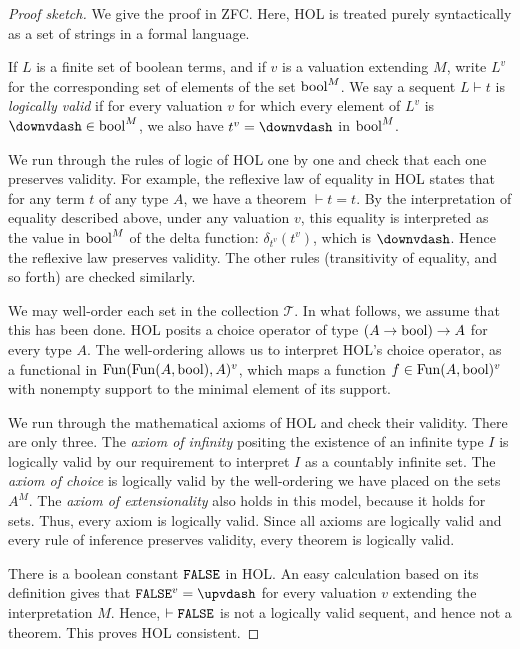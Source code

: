 \documentclass[brochure,english,12pt]{bourbaki}
\theoremstyle{plain}
\def\op#1{{\operatorname{#1}}}
\def\T{{\mathcal T}}
\begin{document}
\begin{proof}[Proof sketch]
We give the proof in ZFC.  Here, HOL is treated purely syntactically as a set of strings in 
a formal language.

If $L$ is a finite set of boolean terms, and if $v$ is a valuation extending $M$,  
write $L^{v}$ for the corresponding set of elements of the set $\bool^M$.
We say a sequent $L \vdash t$ is {\it logically valid}
if for every valuation $v$ for which every element of $L^{v}$ is $\downvdash \in \bool^M$, we also have
$t^{v}=\downvdash $ in $\bool^M$.

We run through the rules of logic of HOL one by one and check that each one preserves
validity.  For example, the reflexive law of equality in HOL states that for any term $t$
of any type $A$, we have a theorem $\vdash t = t$.  By the interpretation of equality described above, under
any valuation $v$, this equality is interpreted as the value in $\bool^M$ of the delta function: 
$\delta_{t^{v}}(t^{v})$, which is $\downvdash $.  Hence the reflexive law preserves validity.
The other rules (transitivity of equality, and so forth) are checked similarly.

We may well-order
 each set in the collection $\T$. In what follows, we 
assume that this
has been done.  HOL posits a choice operator of type $(A\to\bool)\to A$ for every type $A$.  The well-ordering  
allows us to 
interpret HOL's choice operator, as a functional
in $\Fun(\Fun(A,\bool),A)^{v}$, 
which maps a function $f\in \Fun(A,\bool)^{v}$ with nonempty support to
the minimal element of its support.

We run through the mathematical axioms of HOL and check their validity. 
There are only three.  The {\it axiom
of infinity} positing the existence of an infinite type $I$
is logically valid by our requirement to interpret $I$ as a countably infinite set.  The {\it axiom of
choice} is logically valid by the well-ordering we have placed on the sets $A^M$.  The {\it axiom
of extensionality} also holds in this model, because it holds for sets.
Thus, every axiom is logically valid.  
Since all axioms are logically valid and every rule of inference
preserves validity, every theorem is logically valid.

There is a boolean constant $\op{\tt FALSE}$ in HOL.
An easy calculation based on its definition gives that $\op{\tt FALSE}^v = \upvdash$ for every valuation $v$
extending the interpretation $M$.  Hence,
$\vdash \op{\tt FALSE}$ is not a logically valid sequent, and hence not a theorem.
This proves HOL consistent.
\end{proof}
\end{document}
